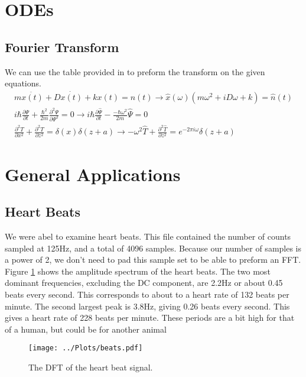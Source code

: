\section{ODEs}
\subsection{Fourier Transform}
We can use the table provided in to preform the transform on the given equations.
\begin{eqnarray*}
m\ddot{x(t)} + D\dot{x(t)} + kx(t) = n(t) \rightarrow \hat{x}(\omega)(m\omega^{2} + iD\omega + k) = \hat{n}(t) \\
i\hbar \frac{\partial \Psi }{\partial t} + \frac{\hbar^{2}}{2m} \frac{\partial^2 \Psi}{\partial \Psi^2} = 0\rightarrow i\hbar \frac{\partial \hat{\Psi}}{\partial t} - \frac{-\hbar \omega^2}{2m}\hat{\Psi} = 0 \\
\frac{\partial^2 T}{\partial x^2} + \frac{\partial^2 T}{\partial z^2} = \delta (x) \delta(z+a) \rightarrow -\omega^2 \hat{T} + \frac{\partial^2 \hat{T}}{\partial z^2} = e^{-2\pi i \omega}\delta (z+a)
\end{eqnarray*}


\section{General Applications}
\subsection{Heart Beats}

We were abel to examine heart beats. This file contained the number of counts sampled at 125Hz, and a total of 4096 samples. Because our number of samples is a power of 2, we don't need to pad this sample set to be able to preform an FFT. Figure \ref{fig:heart_beat} shows the amplitude spectrum of the heart beats. The two most dominant frequencies, excluding the DC component, are 2.2Hz or about 0.45 beats every second. This corresponds to about to a heart rate of 132 beats per minute. The second largest peak is 3.8Hz, giving 0.26 beats every second. This gives a heart rate of 228 beats per minute. These periods are a bit high for that of a human, but could be for another animal
\begin{figure}[ht]
    \centering
    \texttt{[image: ../Plots/beats.pdf]}
    \caption{The DFT of the heart beat signal.}
    \label{fig:heart_beat}
\end{figure}

